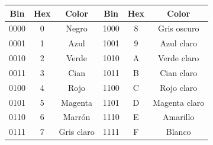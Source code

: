 \documentclass[10pt]{article}
\begin{document}
\begin{table}[H]
\centering
\renewcommand{\arraystretch}{1.2}
\begin{tabular}{|c|c|c|c|c|c|}
\hline
\textbf{Bin} & \textbf{Hex} & \textbf{Color} &
\textbf{Bin} & \textbf{Hex} & \textbf{Color} \\ \hline

0000 & 0 & Negro       & 1000 & 8 & Gris oscuro   \\ \hline
0001 & 1 & Azul        & 1001 & 9 & Azul claro    \\ \hline
0010 & 2 & Verde       & 1010 & A & Verde claro   \\ \hline
0011 & 3 & Cian        & 1011 & B & Cian claro    \\ \hline
0100 & 4 & Rojo        & 1100 & C & Rojo claro    \\ \hline
0101 & 5 & Magenta     & 1101 & D & Magenta claro \\ \hline
0110 & 6 & Marrón      & 1110 & E & Amarillo      \\ \hline
0111 & 7 & Gris claro  & 1111 & F & Blanco        \\ \hline

\end{tabular}
\end{table}
\end{document}
